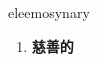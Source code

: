 
\begin{frame}
{\huge eleemosynary}
\begin{center}
\begin{enumerate}\Large
  \item \textbf{慈善的}
\end{enumerate}
\end{center}
\end{frame}
